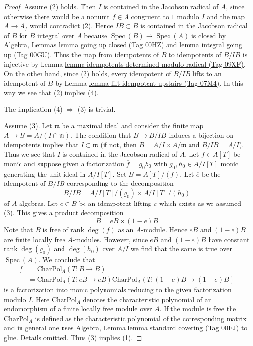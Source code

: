 \documentclass{amsart}
\theoremstyle{plain}
\theoremstyle{definition}
\theoremstyle{remark}
\numberwithin{equation}{subsection}
\def\Spec{\mathop{\mathrm{Spec}}}
\begin{document}
\begin{proof}
Assume (2) holds. Then $I$ is contained in the Jacobson radical of $A$, since
otherwise there would be a nonunit $f \in A$ congruent to $1$ modulo $I$
and the map $A \to A_f$ would contradict (2). Hence $IB \subset B$
is contained in the Jacobson radical of $B$ for $B$ integral over $A$
because $\Spec(B) \to \Spec(A)$ is closed by
Algebra, Lemmas \href{https://stacks.math.columbia.edu/tag/00HZ}{lemma going up closed (Tag 00HZ)} and
\href{https://stacks.math.columbia.edu/tag/00GU}{lemma integral going up (Tag 00GU)}.
Thus the map from idempotents of $B$ to idempotents of $B/IB$
is injective by Lemma \href{https://stacks.math.columbia.edu/tag/09XF}{lemma idempotents determined modulo radical (Tag 09XF)}.
On the other hand, since (2) holds, every idempotent
of $B/IB$ lifts to an idempotent of $B$
by Lemma \href{https://stacks.math.columbia.edu/tag/07M4}{lemma lift idempotent upstairs (Tag 07M4)}.
In this way we see that (2) implies (4).

\medskip\noindent
The implication (4) $\Rightarrow$ (3) is trivial.

\medskip\noindent
Assume (3). Let $\mathfrak m$ be a maximal ideal and consider the
finite map $A \to B = A/(I \cap \mathfrak m)$. The condition that
$B \to B/IB$ induces a bijection on idempotents implies that
$I \subset \mathfrak m$ (if not, then $B = A/I \times A/\mathfrak m$
and $B/IB = A/I$). Thus we see that $I$ is contained in the Jacobson
radical of $A$. Let $f \in A[T]$ be monic and suppose given a
factorization $\overline{f} = g_0h_0$ with $g_0, h_0 \in A/I[T]$ monic
generating the unit ideal in $A/I[T]$.
Set $B = A[T]/(f)$. Let $\overline{e}$ be the idempotent
of $B/IB$ corresponding to the decomposition
$$
B/IB = A/I[T]/(g_0) \times A/I[T]/(h_0)
$$
of $A$-algebras. Let $e \in B$ be an idempotent lifting $\overline{e}$
which exists as we assumed (3). This gives a product decomposition
$$
B = eB \times (1 - e)B
$$
Note that $B$ is free of rank $\deg(f)$ as an $A$-module.
Hence $eB$ and $(1 - e)B$ are finite locally free $A$-modules.
However, since $eB$ and $(1 - e)B$ have constant rank
$\deg(g_0)$ and $\deg(h_0)$ over $A/I$ we find that the same
is true over $\Spec(A)$. We conclude that
\begin{align*}
f & = \text{CharPol}_A(T : B \to B) \\
& =
\text{CharPol}_A(T : eB \to eB)
\text{CharPol}_A(T : (1 - e)B \to (1 - e)B)
\end{align*}
is a factorization into monic polynomials reducing to the given
factorization modulo $I$. Here $\text{CharPol}_A$ denotes the characteristic
polynomial of an endomorphism of a finite locally free module over $A$.
If the module is free the $\text{CharPol}_A$ is defined as the
characteristic polynomial of the corresponding matrix and in
general one uses Algebra, Lemma \href{https://stacks.math.columbia.edu/tag/00EJ}{lemma standard covering (Tag 00EJ)} to
glue. Details omitted. Thus (3) implies (1).


\end{proof}
\end{document}
